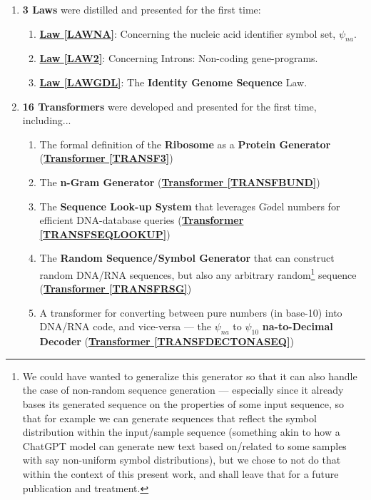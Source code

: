 \documentclass[a4paper, 18pt]{book} %
\begin{document}
\begin{enumerate}
{	\begin{enumerate}
	\item \textbf{Complement Sequences} --- see  \textbf{\hyperref[THEOCOMPLEMENTS]{Theorem \ref{THEOCOMPLEMENTS}}}
	\item \textbf{Complement of an o-SSI is an o-SSI} --- see  \textbf{\hyperref[THEOCOMPLOSSI]{Theorem \ref{THEOCOMPLOSSI}}} 
	\item \textbf{Equivalence of Sequences} under the Complement Transform  --- see  \textbf{\hyperref[THEOCOMPEQUIV]{Theorem \ref{THEOCOMPEQUIV}}} 
	\end{enumerate}
}
\item {\textbf{3 Laws} were distilled and presented for the first time:
	\begin{enumerate}
	\item \textbf{\hyperref[LAWNA]{Law \ref{LAWNA}}}: Concerning the nucleic acid identifier symbol set, $\psi_{na}$. 
	\item \textbf{\hyperref[LAW2]{Law \ref{LAW2}}}: Concerning Introns: Non-coding gene-programs.
	\item \textbf{\hyperref[LAWGDL]{Law \ref{LAWGDL}}}: The \textbf{Identity Genome Sequence} Law.
	\end{enumerate}
}
\item{ \textbf{16 Transformers} were developed and presented for the first time, including...

	\begin{enumerate}
	\item The formal definition of the \textbf{Ribosome} as a \textbf{Protein Generator} (\textbf{\hyperref[TRANSF3]{Transformer \ref{TRANSF3}}})
	\item The \textbf{n-Gram Generator} (\textbf{\hyperref[TRANSFBUND]{Transformer \ref{TRANSFBUND}}})
	\item The \textbf{Sequence Look-up System} that leverages G$\ddot{o}$del numbers for efficient DNA-database queries (\textbf{\hyperref[TRANSFSEQLOOKUP]{Transformer \ref{TRANSFSEQLOOKUP}}})
	\item The \textbf{Random Sequence/Symbol Generator} that can construct random DNA/RNA sequences, but also any arbitrary random\footnote{We could have wanted to generalize this generator so that it can also handle the case of non-random sequence generation --- especially since it already bases its generated sequence on the properties of some input sequence, so that for example we can generate sequences that reflect the symbol distribution within the input/sample sequence (something akin to how a ChatGPT model can generate new text based on/related to some samples with say non-uniform symbol distributions), but we chose to not do that within the context of this present work, and shall leave that for a future publication and treatment.} sequence (\textbf{\hyperref[TRANSFRSG]{Transformer \ref{TRANSFRSG}}})
	\item A transformer for converting between pure numbers (in base-10) into DNA/RNA code, and vice-versa --- the $\psi_{na}$ to $\psi_{10}$ \textbf{na-to-Decimal Decoder} (\textbf{\hyperref[TRANSFDECTONASEQ]{Transformer \ref{TRANSFDECTONASEQ}}})
	\end{enumerate}
	
}
\end{enumerate}
\end{document}
